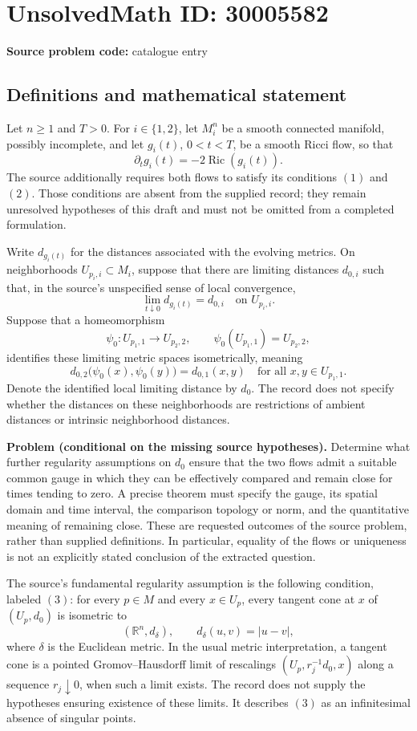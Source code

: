 \documentclass[11pt]{article}
\newcommand{\R}{\mathbb{R}}
\begin{document}
\section*{UnsolvedMath ID: 30005582}
\textbf{Source problem code:} catalogue entry
\subsection{Definitions and mathematical statement}
Let \(n\geq 1\) and \(T>0\). For \(i\in\{1,2\}\), let \(M_i^n\) be a smooth connected manifold, possibly incomplete, and let \(g_i(t)\), \(0<t<T\), be a smooth Ricci flow, so that
\[
\partial_t g_i(t)=-2\operatorname{Ric}(g_i(t)).
\]
The source additionally requires both flows to satisfy its conditions \((1)\) and \((2)\). Those conditions are absent from the supplied record; they remain unresolved hypotheses of this draft and must not be omitted from a completed formulation.

Write \(d_{g_i(t)}\) for the distances associated with the evolving metrics. On neighborhoods \(U_{p_i,i}\subset M_i\), suppose that there are limiting distances \(d_{0,i}\) such that, in the source's unspecified sense of local convergence,
\[
\lim_{t\downarrow0}d_{g_i(t)}=d_{0,i}\quad\text{on }U_{p_i,i}.
\]
Suppose that a homeomorphism
\[
\psi_0:U_{p_1,1}\longrightarrow U_{p_2,2},\qquad
\psi_0(U_{p_1,1})=U_{p_2,2},
\]
identifies these limiting metric spaces isometrically, meaning
\[
d_{0,2}\bigl(\psi_0(x),\psi_0(y)\bigr)=d_{0,1}(x,y)
\quad\text{for all }x,y\in U_{p_1,1}.
\]
Denote the identified local limiting distance by \(d_0\). The record does not specify whether the distances on these neighborhoods are restrictions of ambient distances or intrinsic neighborhood distances.

\textbf{Problem (conditional on the missing source hypotheses).} Determine what further regularity assumptions on \(d_0\) ensure that the two flows admit a suitable common gauge in which they can be effectively compared and remain close for times tending to zero. A precise theorem must specify the gauge, its spatial domain and time interval, the comparison topology or norm, and the quantitative meaning of remaining close. These are requested outcomes of the source problem, rather than supplied definitions. In particular, equality of the flows or uniqueness is not an explicitly stated conclusion of the extracted question.

The source's fundamental regularity assumption is the following condition, labeled \((3)\): for every \(p\in M\) and every \(x\in U_p\), every tangent cone at \(x\) of \((U_p,d_0)\) is isometric to
\[
(\R^n,d_\delta),\qquad d_\delta(u,v)=|u-v|,
\]
where \(\delta\) is the Euclidean metric. In the usual metric interpretation, a tangent cone is a pointed Gromov--Hausdorff limit of rescalings \((U_p,r_j^{-1}d_0,x)\) along a sequence \(r_j\downarrow0\), when such a limit exists. The record does not supply the hypotheses ensuring existence of these limits. It describes \((3)\) as an infinitesimal absence of singular points.
\end{document}
